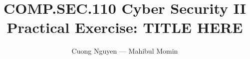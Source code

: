 \documentclass{article}
\title{COMP.SEC.110 Cyber Security II
    \large Practical Exercise: TITLE HERE\!
}
\author{Cuong Nguyen --- Mahibul Momin}
\begin{document}
    
\maketitle
\tableofcontents
\newpage

\listoffigures
\newpage

% 
% 

\printbibliography{}
\end{document}
